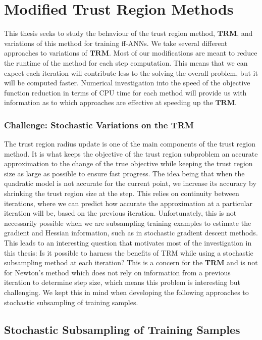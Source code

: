 \documentclass[letterpaper,12pt,titlepage,oneside,final]{book}
\begin{document}
	\chapter{Modified Trust Region Methods}
	
	This thesis seeks to study the behaviour of the trust region method, $\mathbf{TRM}$, and variations of this method for training ff-ANNs. We take several different approaches to variations of $\mathbf{TRM}$. Most of our modifications are meant to reduce the runtime of the method for each step computation. This means that we can expect each iteration will contribute less to the solving the overall problem, but it will be computed faster. Numerical investigation into the speed of the objective function reduction in terms of CPU time for each method will provide us with information as to which approaches are effective at speeding up the $\mathbf{TRM}$.
	
	\subsection{Challenge: Stochastic Variations on the \textbf{TRM}}
	
	The trust region radius update is one of the main components of the trust region method. It is what keeps the objective of the trust region subproblem an accurate approximation to the change of the true objective while keeping the trust region size as large as possible to ensure fast progress. The idea being that when the quadratic model is not accurate for the current point, we increase its accuracy by shrinking the trust region size at the step. This relies on continuity between iterations, where we can predict how accurate the approximation at a particular iteration will be, based on the previous iteration. Unfortunately, this is not necessarily possible when we are subsampling training examples to estimate the gradient and Hessian information, such as in stochastic gradient descent methods. This leads to an interesting question that motivates most of the investigation in this thesis: Is it possible to harness the benefits of TRM while using a stochastic subsampling method at each iteration? This is a concern for the \textbf{TRM} and is not for Newton's method which does not rely on information from a previous iteration to determine step size, which means this problem is interesting but challenging. We kept this in mind when developing the following approaches to stochastic subsampling of training samples.
	
	\section{Stochastic Subsampling of Training Samples}
	
\end{document}
